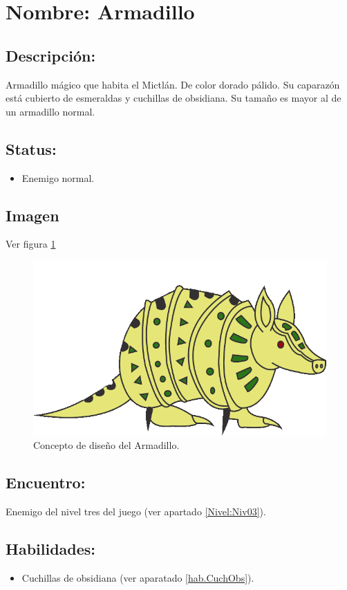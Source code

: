 \section{Nombre: Armadillo}  \label{per:armadillo} 
\subsection{Descripción:}
Armadillo mágico que habita el Mictlán. De color dorado pálido. Su caparazón está cubierto de esmeraldas y cuchillas de obsidiana. Su tamaño es mayor al de un armadillo normal. 
\subsection{Status:}
\begin{itemize}
	\item Enemigo normal.
\end{itemize}
\subsection{Imagen}
Ver figura \ref{fig:armadillo}
\begin{figure}
	\centering
	\includegraphics[height=0.2 \textheight]{Imagenes/armadilloNormal}
	\caption{Concepto de diseño del Armadillo.}
	\label{fig:armadillo}
\end{figure} 

\subsection{Encuentro:}
Enemigo del nivel tres del juego (ver apartado \ref{Nivel:Niv03}).
\subsection{Habilidades:}
\begin{itemize}
	\item Cuchillas de obsidiana (ver aparatado \ref{hab.CuchObs}).
\end{itemize}
